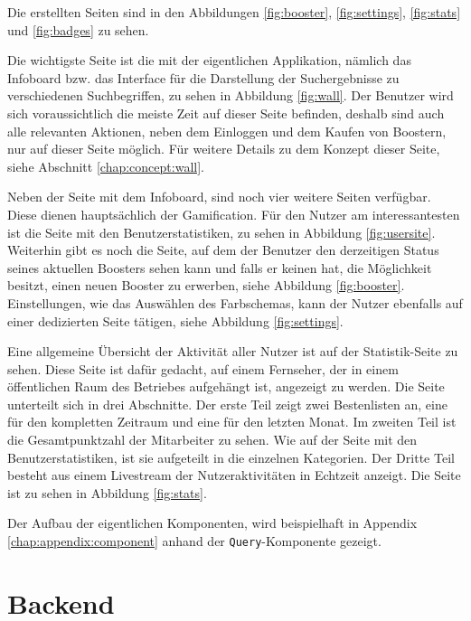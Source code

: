 \documentclass[12pt,twoside]{book}
\begin{document}
Die erstellten Seiten sind in den Abbildungen \ref{fig:booster}, \ref{fig:settings}, \ref{fig:stats} und \ref{fig:badges} zu sehen.

Die wichtigste Seite ist die mit der eigentlichen Applikation, nämlich das Infoboard bzw. das Interface für die Darstellung der Suchergebnisse zu verschiedenen Suchbegriffen, zu sehen in Abbildung \ref{fig:wall}. Der Benutzer wird sich voraussichtlich die meiste Zeit auf dieser Seite befinden, deshalb sind auch alle relevanten Aktionen, neben dem Einloggen und dem Kaufen von Boostern, nur auf dieser Seite möglich. Für weitere Details zu dem Konzept dieser Seite, siehe Abschnitt \ref{chap:concept:wall}.

Neben der Seite mit dem Infoboard, sind noch vier weitere Seiten verfügbar. Diese dienen hauptsächlich der Gamification. Für den Nutzer am interessantesten ist die Seite mit den Benutzerstatistiken, zu sehen in Abbildung \ref{fig:usersite}.
Weiterhin gibt es noch die Seite, auf dem der Benutzer den derzeitigen Status seines aktuellen Boosters sehen kann und falls er keinen hat, die Möglichkeit besitzt, einen neuen Booster zu erwerben, siehe Abbildung \ref{fig:booster}. Einstellungen, wie das Auswählen des Farbschemas, kann der Nutzer ebenfalls auf einer dedizierten Seite tätigen, siehe Abbildung \ref{fig:settings}.

Eine allgemeine Übersicht der Aktivität aller Nutzer ist auf der Statistik-Seite zu sehen. Diese Seite ist dafür gedacht, auf einem Fernseher, der in einem öffentlichen Raum des Betriebes aufgehängt ist, angezeigt zu werden. Die Seite unterteilt sich in drei Abschnitte. Der erste Teil zeigt zwei Bestenlisten an, eine für den kompletten Zeitraum und eine für den letzten Monat. Im zweiten Teil ist die Gesamtpunktzahl der Mitarbeiter zu sehen. Wie auf der Seite mit den Benutzerstatistiken, ist sie aufgeteilt in die einzelnen Kategorien. Der Dritte Teil besteht aus einem Livestream der Nutzeraktivitäten in Echtzeit anzeigt. Die Seite ist zu sehen in Abbildung \ref{fig:stats}.

Der Aufbau der eigentlichen Komponenten, wird beispielhaft in Appendix \ref{chap:appendix:component} anhand der \texttt{Query}-Komponente gezeigt.

\section{Backend}\label{sec:backend}
\end{document}
